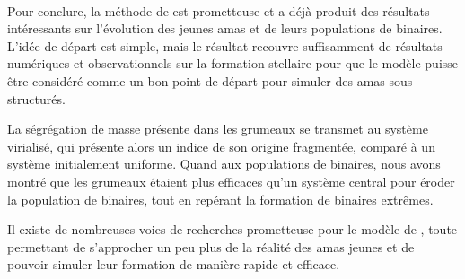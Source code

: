 \paragraph*{}
Pour conclure, la m\'ethode de \HubLem est prometteuse et a d\'ej\`a produit des r\'esultats int\'eressants sur l'\'evolution des jeunes amas et de leurs populations de binaires. L'id\'ee de d\'epart est simple, mais le r\'esultat recouvre suffisamment de r\'esultats num\'eriques et observationnels sur la formation stellaire pour que le mod\`ele puisse \^etre consid\'er\'e comme un bon point de d\'epart pour simuler des amas sous-structur\'es.

La s\'egr\'egation de masse pr\'esente dans les grumeaux se transmet au syst\`eme virialis\'e, qui pr\'esente alors un indice de son origine fragment\'ee, compar\'e \`a un syst\`eme initialement uniforme. Quand aux populations de binaires, nous avons montr\'e que les grumeaux \'etaient plus efficaces qu'un syst\`eme central pour \'eroder la population de binaires, tout en rep\'erant la formation de binaires extr\^emes.

Il existe de nombreuses voies de recherches prometteuse pour le mod\`ele de \HubLem, toute permettant de s'approcher un peu plus de la r\'ealit\'e des amas jeunes et de pouvoir simuler leur formation de mani\`ere rapide et efficace.
